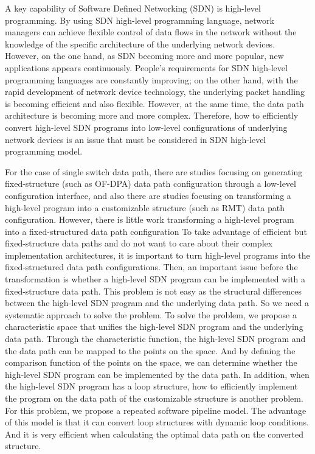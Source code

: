 
\begin{eabstract}

A key capability of Software Defined Networking (SDN) is high-level programming. By using SDN high-level programming language, network managers can achieve flexible control of data flows in the network without the knowledge of the specific architecture of the underlying network devices. However, on the one hand, as SDN becoming more and more popular, new applications appears continuously. People's requirements for SDN high-level programming languages ​​are constantly improving; on the other hand, with the rapid development of network device technology, the underlying packet handling is becoming efficient and also flexible. However, at the same time, the data path architecture is becoming more and more complex. Therefore, how to efficiently convert high-level SDN programs into low-level configurations of underlying network devices is an issue that must be considered in SDN high-level programming model.



For the case of single switch data path, there are studies focusing on generating fixed-structure (such as OF-DPA) data path configuration through a low-level configuration interface, and also there are studies focusing on transforming a high-level program into a customizable structure (such as RMT) data path configuration. However, there is little work transforming a high-level program into a fixed-structured data path configuration To take advantage of efficient but fixed-structure data paths and do not want to care about their complex implementation architectures, it is important to turn high-level programs into the fixed-structured data path configurations. Then, an important issue before the transformation is whether a high-level SDN program can be implemented with a fixed-structure data path. This problem is not easy as the structural differences between the high-level SDN program and the underlying data path. So we need a systematic approach to solve the problem. To solve the problem, we propose a characteristic space that unifies the high-level SDN program and the underlying data path. Through the characteristic function, the high-level SDN program and the data path can be mapped to the points on the space. And by defining the comparison function of the points on the space, we can determine whether the high-level SDN program can be implemented by the data path. In addition, when the high-level SDN program has a loop structure, how to efficiently implement the program on the data path of the customizable structure is another problem. For this problem, we propose a repeated software pipeline model. The advantage of this model is that it can convert loop structures with dynamic loop conditions. And it is very efficient when calculating the optimal data path on the converted structure.





\end{eabstract}
